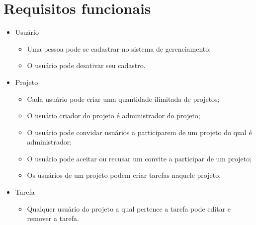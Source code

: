 \documentclass{article}
\begin{document}
\section{Requisitos funcionais}
\begin{itemize}
    \item Usuário
    \begin{itemize}
        \item Uma pessoa pode se cadastrar no sistema de gerenciamento;
        \item O usuário pode desativar seu cadastro.
    \end{itemize}
    \item Projeto
    \begin{itemize}
        \item Cada usuário pode criar uma quantidade ilimitada de projetos;
        \item O usuário criador do projeto é administrador do projeto;
        \item O usuário pode convidar usuários a participarem de um projeto do qual é administrador;
        \item O usuário pode aceitar ou recusar um convite a participar de um projeto;
        \item Os usuários de um projeto podem criar tarefas naquele projeto.
    \end{itemize}
    \item Tarefa
    \begin{itemize}
        \item Qualquer usuário do projeto a qual pertence a tarefa pode editar e remover a tarefa.
    \end{itemize}
\end{itemize}
\end{document}

